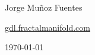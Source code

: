 \begin{titlepage}
  \centering
  \vspace*{3cm}

  {\Huge\bfseries \booktitle\par}
  \vspace{0.4cm}
  {\Large\itshape \booksubtitle\par}
  \vspace{0.6cm}
  {\large \booktagline\par}

  \vfill

  {\Large Jorge Mu\~noz Fuentes\par}
  \vspace{1cm}
  {\large \href{https://gdl.fractalmanifold.com}{gdl.fractalmanifold.com}\par}

  \vspace{1cm}
  {\large \today\par}
\end{titlepage}
